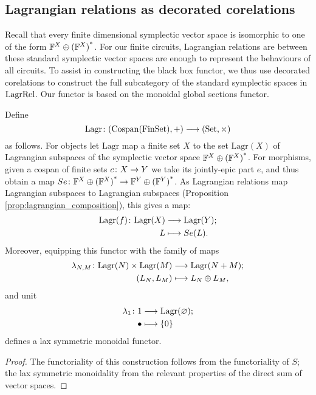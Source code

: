 \subsection{Lagrangian relations as decorated corelations}
\label{ssec.lagrrelascorel}
Recall that every finite dimensional symplectic vector space is isomorphic to
one of the form ${{\mathbb F}^{X} \oplus {({\mathbb F}^{X})}^\ast}$. For our finite circuits, Lagrangian relations are
between these standard symplectic vector spaces are enough to represent the
behaviours of all circuits. To assist in constructing the black box functor, we
thus use decorated corelations to construct the full subcategory of the standard
symplectic spaces in $\mathrm{LagrRel}$. Our functor is based on the monoidal global
sections functor.

\begin{proposition}
Define 
\[
  \mathrm{Lagr}{\colon} (\operatorname{{Cospan}}(\mathrm{FinSet}),+) \longrightarrow (\mathrm{Set},\times)
\]
as follows. For objects let $\mathrm{Lagr}$ map a finite set $X$ to the set
$\mathrm{Lagr}(X)$ of Lagrangian subspaces of the symplectic vector space
${{\mathbb F}^{X} \oplus {({\mathbb F}^{X})}^\ast}$.  For morphisms, given a cospan of finite sets $c{\colon} X \to Y$ we
take its jointly-epic part $e$, and thus obtain a map $Se{\colon} {{\mathbb F}^{X} \oplus {({\mathbb F}^{X})}^\ast} \to
{{\mathbb F}^{Y} \oplus {({\mathbb F}^{Y})}^\ast}$. As Lagrangian relations map Lagrangian subspaces to Lagrangian
subspaces (Proposition \ref{prop:lagrangian_composition}), this gives a map: 
\begin{align*}
  \mathrm{Lagr}(f){\colon} \mathrm{Lagr}(X) &\longrightarrow \mathrm{Lagr}(Y); \\
  L &\longmapsto Se(L).
\end{align*}
Moreover, equipping this functor with the family of maps
\begin{align*}
  \lambda_{N,M}{\colon} \mathrm{Lagr}(N) \times \mathrm{Lagr}(M) &\longrightarrow
  \mathrm{Lagr}(N+M);\\
  (L_N,L_M) &\longmapsto L_N \oplus L_M,
\end{align*}
and unit
\begin{align*}
  \lambda_1{\colon} 1 &\longrightarrow \mathrm{Lagr}(\varnothing);\\
  \bullet &\longmapsto \{0\}
\end{align*}
defines a lax symmetric monoidal functor.
\end{proposition}
\begin{proof}
  The functoriality of this construction follows from the functoriality of $S$;
  the lax symmetric monoidality from the relevant properties of the direct sum
  of vector spaces.
\end{proof}

